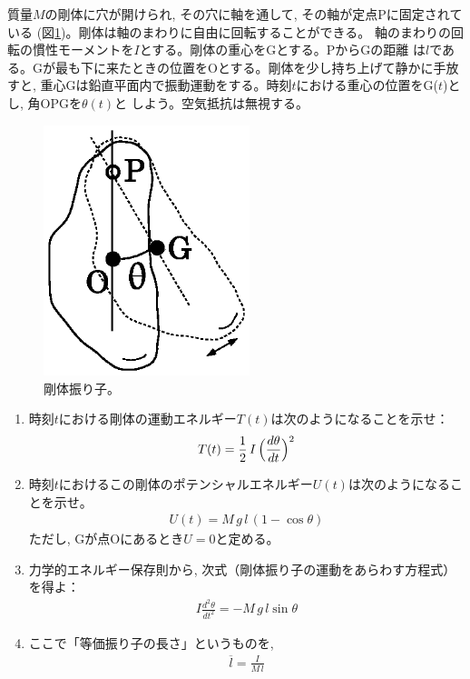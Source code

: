 \begin{q}
\begin{q}\label{q:mominert_pandulum}
質量$M$の剛体に穴が開けられ, その穴に軸を通して, その軸が定点Pに固定されている
(図\ref{fig:solid_pendulum})。剛体は軸のまわりに自由に回転することができる。
軸のまわりの回転の慣性モーメントを$I$とする。剛体の重心をGとする。PからGの距離
は$l$である。Gが最も下に来たときの位置をOとする。剛体を少し持ち上げて静かに手放すと, 
重心Gは鉛直平面内で振動運動をする。時刻$t$における重心の位置をG($t$)とし, 角OPGを$\theta(t)$と
しよう。空気抵抗は無視する。
\begin{figure}[h]
    \centering
    \includegraphics[width=6cm]{solid_pendulum.eps}
    \caption{剛体振り子。}\label{fig:solid_pendulum}
\end{figure}
\begin{enumerate}
\item 時刻$t$における剛体の運動エネルギー$T(t)$は次のようになることを示せ：
\begin{eqnarray}T(t)=\frac{1}{2}\,I\,\Bigl(\frac{d\theta}{dt}\Bigr)^2\end{eqnarray}
\item 時刻$t$におけるこの剛体のポテンシャルエネルギー$U(t)$は次のようになることを示せ。
\begin{eqnarray}U(t)=M\,g\,l\,(1-\cos \theta)\end{eqnarray}
ただし, Gが点Oにあるとき$U=0$と定める。
\item 力学的エネルギー保存則から, 次式（剛体振り子の運動をあらわす方程式）を得よ：
\begin{eqnarray}
I\frac{d^2\theta}{dt^2}=-M\,g\,l\sin\theta\label{q:mominert_pandulum5}
\end{eqnarray}
\item ここで「等価振り子の長さ」というものを, 
\begin{eqnarray}
\overline{l}=\frac{I}{M\,l}\label{q:mominert_pandulum6}

\end{eqnarray}
\end{enumerate}
\end{q}
\end{q}
